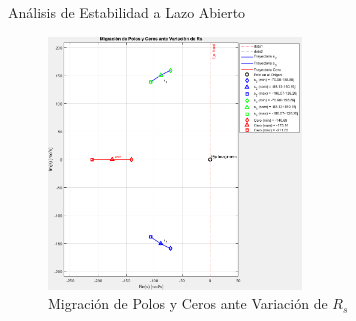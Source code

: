 \documentclass[12pt]{beamer}
\begin{document}
\begin{frame}{Análisis de Estabilidad a Lazo Abierto}
\scriptsize
    \begin{figure}[H]
    \centering
    \includegraphics[width=0.6\textwidth]{Imagenes/migracion_polos_ceros.png}
    \caption{Migración de Polos y Ceros ante Variación de \( R_s \)}
    \label{fig:migracion_polos_ceros}
\end{figure}
\end{frame}
\end{document}
